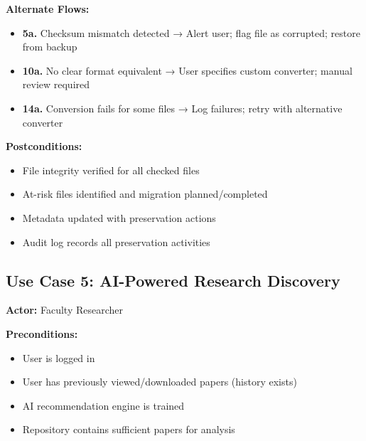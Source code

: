 \documentclass[12pt,a4paper]{report}
\begin{document}
\textbf{Alternate Flows:}
\begin{itemize}
    \item \textbf{5a.} Checksum mismatch detected → Alert user; flag file as corrupted; restore from backup
    \item \textbf{10a.} No clear format equivalent → User specifies custom converter; manual review required
    \item \textbf{14a.} Conversion fails for some files → Log failures; retry with alternative converter
\end{itemize}

\textbf{Postconditions:}
\begin{itemize}
    \item File integrity verified for all checked files
    \item At-risk files identified and migration planned/completed
    \item Metadata updated with preservation actions
    \item Audit log records all preservation activities
\end{itemize}

\subsection{Use Case 5: AI-Powered Research Discovery}

\textbf{Actor:} Faculty Researcher

\textbf{Preconditions:}
\begin{itemize}
    \item User is logged in
    \item User has previously viewed/downloaded papers (history exists)
    \item AI recommendation engine is trained
    \item Repository contains sufficient papers for analysis
\end{itemize}
\end{document}
